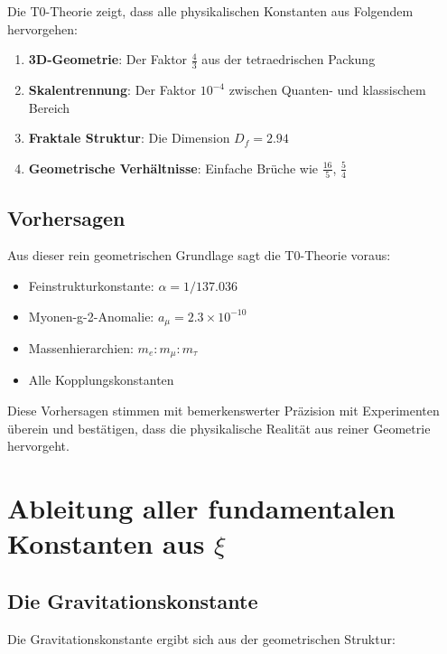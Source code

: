 \documentclass[12pt,a4paper]{article}
\newcommand{\xipar}{\xi}
\begin{document}
	Die T0-Theorie zeigt, dass alle physikalischen Konstanten aus Folgendem hervorgehen:
	
	\begin{enumerate}
		\item \textbf{3D-Geometrie}: Der Faktor $\frac{4}{3}$ aus der tetraedrischen Packung
		\item \textbf{Skalentrennung}: Der Faktor $10^{-4}$ zwischen Quanten- und klassischem Bereich
		\item \textbf{Fraktale Struktur}: Die Dimension $D_f = 2.94$
		\item \textbf{Geometrische Verhältnisse}: Einfache Brüche wie $\frac{16}{5}$, $\frac{5}{4}$
	\end{enumerate}
	
	\subsection{Vorhersagen}
	
	Aus dieser rein geometrischen Grundlage sagt die T0-Theorie voraus:
	
	\begin{itemize}
		\item Feinstrukturkonstante: $\alpha = 1/137.036$
		\item Myonen-g-2-Anomalie: $a_\mu = 2.3 \times 10^{-10}$
		\item Massenhierarchien: $m_e : m_\mu : m_\tau$
		\item Alle Kopplungskonstanten
	\end{itemize}
	
	Diese Vorhersagen stimmen mit bemerkenswerter Präzision mit Experimenten überein und bestätigen, dass die physikalische Realität aus reiner Geometrie hervorgeht.
	
	\section{Ableitung aller fundamentalen Konstanten aus $\xipar$}
	
	\subsection{Die Gravitationskonstante}
	
	Die Gravitationskonstante ergibt sich aus der geometrischen Struktur:
	
\end{document}
